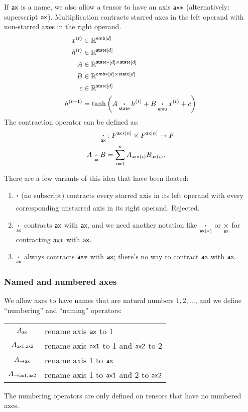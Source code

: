 If $\mathsf{ax}$ is a name, we also allow a tensor to have an axis $\mathsf{ax*}$ (alternatively: superscript $\mathsf{ax}$). Multiplication contracts starred axes in the left operand with non-starred axes in the right operand.
\begin{align*}
x^{(t)} &\in \mathbb{R}^{\mathsf{emb}[d]} \\
h^{(t)} &\in \mathbb{R}^{\mathsf{state}[d]} \\
A &\in \mathbb{R}^{\mathsf{state*}[d] \times \mathsf{state}[d]} \\
B &\in \mathbb{R}^{\mathsf{emb*}[d] \times \mathsf{state}[d]} \\
c &\in \mathbb{R}^{\mathsf{state}[d]} \\
h^{(t+1)} &= \tanh\left( A \mathbin{\mathop{\boldsymbol\cdot}\limits_{\mathsf{state}}} h^{(t)} + B \mathbin{\mathop{\boldsymbol\cdot}\limits_{\mathsf{emb}}} x^{(t)} + c \right) 
\end{align*}
The contraction operator can be defined as:
\begin{align*}
\mathbin{\mathop{\boldsymbol\cdot}\limits_{\mathsf{ax}}} &: F^{\mathsf{ax*}[n]} \times F^{\mathsf{ax}[n]} \rightarrow F \\
A \mathbin{\mathop{\boldsymbol\cdot}\limits_{\mathsf{ax}}} B &= \sum_{i=1}^n A_{\mathsf{ax*}(i)} B_{\mathsf{ax}(i)}.
\end{align*}

There are a few variants of this idea that have been floated:
\begin{enumerate}
\item $\mathbin{\mathop{\boldsymbol\cdot}\limits_{\mathsf{}}}$ (no subscript) contracts every starred axis in its left operand with every corresponding unstarred axis in its right operand. Rejected.
\item $\mathbin{\mathop{\boldsymbol\cdot}\limits_{\mathsf{ax}}}$ contracts $\mathsf{ax}$ with $\mathsf{ax}$, and we need another notation like $\mathbin{\mathop{\boldsymbol\cdot}\limits_{\mathsf{ax(*)}}}$ or $\mathbin{\mathop{\times}\limits_{\mathsf{ax}}}$ for contracting $\mathsf{ax*}$ with $\mathsf{ax}$.
\item $\mathbin{\mathop{\boldsymbol\cdot}\limits_{\mathsf{ax}}}$ always contracts $\mathsf{ax*}$ with $\mathsf{ax}$; there's no way to contract $\mathsf{ax}$ with $\mathsf{ax}$.
\end{enumerate}

\subsubsection{Named and numbered axes}
\label{sec:tensorsoftensors}

We allow axes to have names that are natural numbers $1, 2, \ldots$, and we define ``numbering'' and ``naming'' operators:
\begin{center}
\begin{tabular}{cl}
$A_{\mathsf{ax}}$ & rename axis $\mathsf{ax}$ to 1 \\
$A_{\mathsf{ax1},\mathsf{ax2}}$ & rename axis $\mathsf{ax1}$ to 1 and $\mathsf{ax2}$ to 2 \\
$A_{\rightarrow\mathsf{ax}}$ & rename axis 1 to $\mathsf{ax}$ \\
$A_{\rightarrow\mathsf{ax1},\mathsf{ax2}}$ & rename axis 1 to $\mathsf{ax1}$ and 2 to $\mathsf{ax2}$
\end{tabular}
\end{center}
The numbering operators are only defined on tensors that have no numbered axes.

